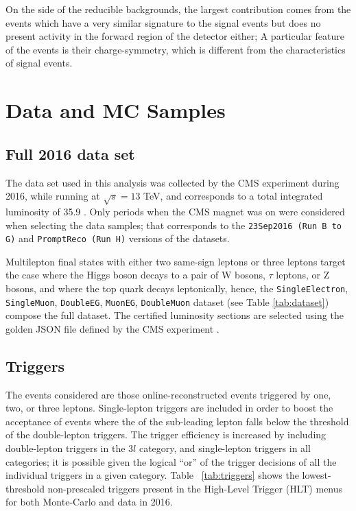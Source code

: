 On the side of the reducible backgrounds, the largest contribution comes from the \ttbar events which have a very similar signature to the signal events but does no present activity in the forward region of the detector either; A particular feature of the \ttbar events is their charge-symmetry, which is different from the characteristics of signal events.
\section{Data and MC Samples} \label{secc:samples}

\subsection{ Full 2016 data set}

The data set used in this analysis was collected by the CMS experiment during 2016, while running at $\sqrt{s}=13$ TeV, and corresponds to a total integrated luminosity of 35.9 \fbinv. Only periods when the CMS magnet was on were considered when selecting the data samples; that corresponds to the \verb|23Sep2016 (Run B to G)| and \verb|PromptReco (Run H)| versions of the datasets.

Multilepton final states with either two same-sign leptons or three leptons target the case where the Higgs boson decays to a pair of W bosons, $\tau$ leptons, or Z bosons, and where the top quark decays leptonically, hence, the \verb|SingleElectron|, \verb|SingleMuon|, \verb|DoubleEG|, \verb|MuonEG|, \verb|DoubleMuon| dataset (see Table \ref{tab:dataset}) compose the full dataset. The certified luminosity sections are selected using the golden JSON file defined by the CMS experiment \cite{json}.

\subsection{Triggers}

The events considered are those online-reconstructed events triggered by one, two, or three leptons. Single-lepton triggers are included in order to boost the acceptance of events where the \pt of the sub-leading lepton falls below the threshold of the double-lepton triggers. The trigger efficiency is increased by including double-lepton triggers in the $3l$ category, and single-lepton triggers in all categories; it is possible given the logical ``or'' of the trigger decisions of all the individual triggers in a given category. Table ~\ref{tab:triggers} shows the lowest-threshold non-prescaled triggers present in the High-Level Trigger (HLT) menus for both Monte-Carlo and data in 2016.

